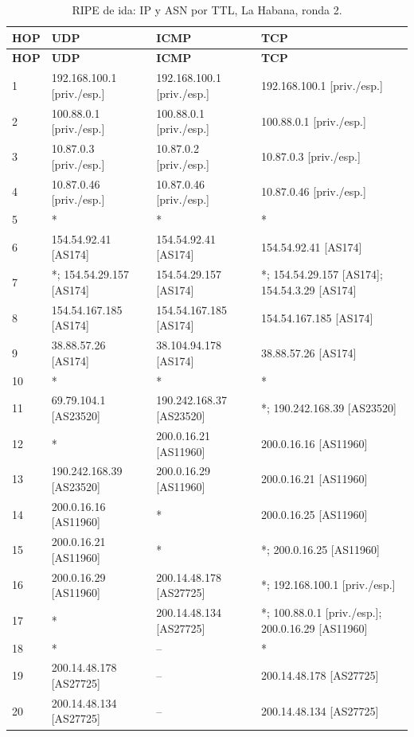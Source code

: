 \begin{longtable}{p{0.95cm}p{4.716666666666667cm}p{4.716666666666667cm}p{4.716666666666667cm}}
\caption{RIPE de ida: IP y ASN por TTL, La Habana, ronda 2.}\label{ripe:200.14.48.134} \\
\toprule
\textbf{HOP} & \textbf{UDP} & \textbf{ICMP} & \textbf{TCP} \\ \midrule
\endfirsthead
\toprule
\textbf{HOP} & \textbf{UDP} & \textbf{ICMP} & \textbf{TCP} \\ \midrule
\endhead
1 & 192.168.100.1 [priv./esp.] & 192.168.100.1 [priv./esp.] & 192.168.100.1 [priv./esp.] \\
2 & 100.88.0.1 [priv./esp.] & 100.88.0.1 [priv./esp.] & 100.88.0.1 [priv./esp.] \\
3 & 10.87.0.3 [priv./esp.] & 10.87.0.2 [priv./esp.] & 10.87.0.3 [priv./esp.] \\
4 & 10.87.0.46 [priv./esp.] & 10.87.0.46 [priv./esp.] & 10.87.0.46 [priv./esp.] \\
5 & * & * & * \\
6 & 154.54.92.41 [AS174] & 154.54.92.41 [AS174] & 154.54.92.41 [AS174] \\
7 & *; 154.54.29.157 [AS174] & 154.54.29.157 [AS174] & *; 154.54.29.157 [AS174]; 154.54.3.29 [AS174] \\
8 & 154.54.167.185 [AS174] & 154.54.167.185 [AS174] & 154.54.167.185 [AS174] \\
9 & 38.88.57.26 [AS174] & 38.104.94.178 [AS174] & 38.88.57.26 [AS174] \\
10 & * & * & * \\
11 & 69.79.104.1 [AS23520] & 190.242.168.37 [AS23520] & *; 190.242.168.39 [AS23520] \\
12 & * & 200.0.16.21 [AS11960] & 200.0.16.16 [AS11960] \\
13 & 190.242.168.39 [AS23520] & 200.0.16.29 [AS11960] & 200.0.16.21 [AS11960] \\
14 & 200.0.16.16 [AS11960] & * & 200.0.16.25 [AS11960] \\
15 & 200.0.16.21 [AS11960] & * & *; 200.0.16.25 [AS11960] \\
16 & 200.0.16.29 [AS11960] & 200.14.48.178 [AS27725] & *; 192.168.100.1 [priv./esp.] \\
17 & * & 200.14.48.134 [AS27725] & *; 100.88.0.1 [priv./esp.]; 200.0.16.29 [AS11960] \\
18 & * & -- & * \\
19 & 200.14.48.178 [AS27725] & -- & 200.14.48.178 [AS27725] \\
20 & 200.14.48.134 [AS27725] & -- & 200.14.48.134 [AS27725] \\
\bottomrule
\end{longtable}

